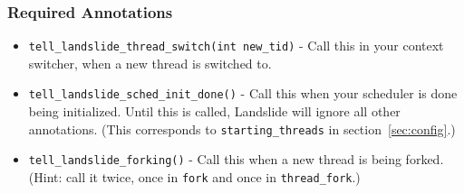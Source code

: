 \documentclass{article}
\begin{document}
\subsubsection{Required Annotations}
\begin{itemize}
	\item \texttt{tell\_landslide\_thread\_switch(int new\_tid)} - Call this in your context switcher, when a new thread is switched to.
	\item \texttt{tell\_landslide\_sched\_init\_done()} - Call this when your scheduler is done being initialized. Until this is called, Landslide will ignore all other annotations. (This corresponds to \texttt{starting\_threads} in section~\ref{sec:config}.)
	\item \texttt{tell\_landslide\_forking()} - Call this when a new thread is being forked.
		(Hint: call it twice, once in \texttt{fork} and once in \texttt{thread\_fork}.)


\end{itemize}
\end{document}

